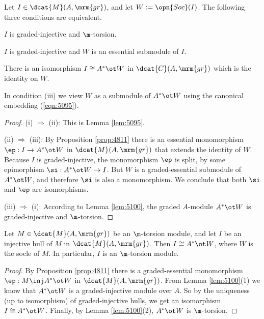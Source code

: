 \begin{lem} \label{lem:3838}
Let $I \in \dcat{M}(A, \mrm{gr})$, and let 
$W := \opn{Soc}(I)$. The following three conditions are equivalent.
\begin{enumerate}
 $I$ is graded-injective and $\m$-torsion. 

 $I$ is graded-injective and $W$ is an essential submodule of $I$. 

 There is an isomorphism 
$I \cong A^* \ot W$ in $\dcat{C}(A, \mrm{gr})$ which is the identity on $W$. 
\end{enumerate}
\end{lem}

In condition (iii) we view $W$ as a submodule of $A^* \ot W$ using the 
canonical embedding (\ref{eqn:5095}).

\begin{proof} \mbox{}

\smallskip \noindent
(i) $\Rightarrow$ (ii): This is Lemma \ref{lem:5095}.

\medskip \noindent
(ii) $\Rightarrow$ (iii): 
By Proposition \ref{prop:4811} there is an essential monomorphism 
$\ep : I \to A^* \ot W$ in $\dcat{M}(A, \mrm{gr})$
that extends the identity of $W$. Because $I$ is graded-injective, the 
monomorphism $\ep$ is split, by some epimorphism $\si : A^* \ot W \to I$. 
But $W$ is a graded-essential submodule of $A^* \ot W$, and therefore $\si$ is 
also a monomorphism. We conclude that both $\si$ and $\ep$ are 
isomorphisms. 

\medskip \noindent
(iii) $\Rightarrow$ (i): 
According to Lemma \ref{lem:5100}, the graded $A$-module $A^* \ot W$ is 
graded-injective and $\m$-torsion.
\end{proof}

\begin{lem} \label{lem:3900}
Let $M \in \dcat{M}(A, \mrm{gr})$ be an $\m$-torsion module, and let $I$ be an 
injective hull of $M$ in $\dcat{M}(A, \mrm{gr})$. Then 
$I \cong A^* \ot W$, where $W$ is the socle of $M$. 
In particular, $I$ is an  $\m$-torsion module.
\end{lem}

\begin{proof}
By Proposition \ref{prop:4811} there is a graded-essential monomorphism 
$\ep : M \inj A^* \ot W$ in $\dcat{M}(A, \mrm{gr})$.
From Lemma \ref{lem:5100}(1) we know that $A^* \ot W$ is a 
graded-injective module over $A$. So by the uniqueness (up to isomorphism) 
of graded-injective hulls, we get an isomorphism 
$I \cong A^* \ot W$. Finally, by Lemma \ref{lem:5100}(2),
$A^* \ot W$ is $\m$-torsion. 
\end{proof}

